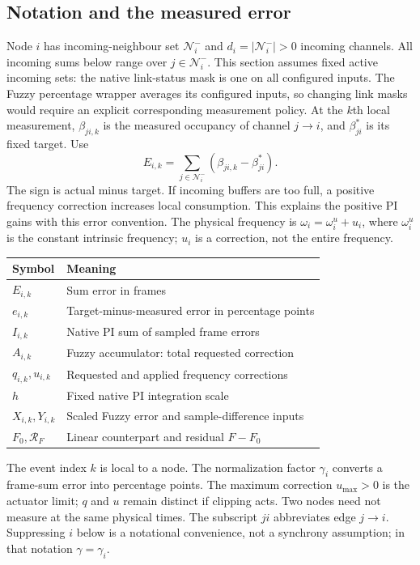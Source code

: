 \subsection{Notation and the measured error}

Node $i$ has incoming-neighbour set $\mathcal N_i^-$ and $d_i=|\mathcal N_i^-|>0$ incoming channels. All incoming sums below range over $j\in\mathcal N_i^-$. This section assumes fixed active
incoming sets: the native link-status mask is one on all configured inputs.
The Fuzzy percentage wrapper averages its configured inputs, so changing
link masks would require an explicit corresponding measurement policy.
At the $k$th local measurement,
$\beta_{ji,k}$ is the measured occupancy of channel $j\to i$, and
$\beta^*_{ji}$ is its fixed target. Use
\begin{equation}
 E_{i,k}=\sum_{j\in\mathcal N_i^-}(\beta_{ji,k}-\beta^*_{ji}).
 \label{detail:eq:fpi_error}
\end{equation}
The sign is actual minus target. If incoming buffers are too full, a
positive frequency correction increases local consumption. This explains
the positive PI gains with this error convention. The physical frequency is $\omega_i=\omega_i^u+u_i$, where $\omega_i^u$ is the constant intrinsic frequency; $u_i$ is a correction, not the entire frequency.

\begin{center}
\begin{tabular}{@{}ll@{}}
\toprule
Symbol & Meaning \\
\midrule
$E_{i,k}$ & Sum error in frames \\
$e_{i,k}$ & Target-minus-measured error in percentage points \\
$I_{i,k}$ & Native PI sum of sampled frame errors \\
$A_{i,k}$ & Fuzzy accumulator: total requested correction \\
$q_{i,k},u_{i,k}$ & Requested and applied frequency corrections \\
$h$ & Fixed native PI integration scale \\
$X_{i,k},Y_{i,k}$ & Scaled Fuzzy error and sample-difference inputs \\
$F_0,\mathcal R_F$ & Linear counterpart and residual $F-F_0$ \\
\bottomrule
\end{tabular}
\end{center}

The event index $k$ is local to a node. The normalization factor $\gamma_i$ converts a frame-sum error into percentage points. The maximum correction $u_{\max}>0$ is the actuator limit; $q$ and $u$ remain distinct if clipping acts. Two nodes need not measure at the
same physical times. The subscript $ji$ abbreviates edge $j\to i$.
Suppressing $i$ below is a notational convenience, not a synchrony
assumption; in that notation $\gamma=\gamma_i$.

